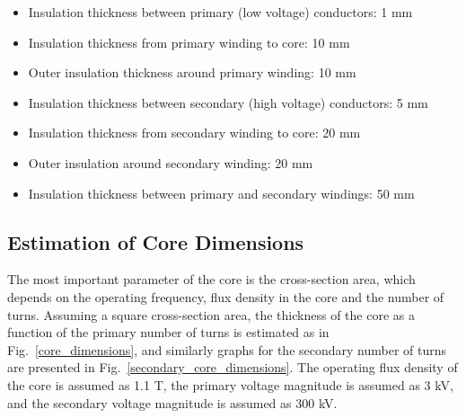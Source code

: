 \documentclass[a4paper, 11pt]{article} %
\begin{document}
\begin{itemize}
\item Insulation thickness between primary (low voltage) conductors: 1 mm
\item Insulation thickness from primary winding to core: 10 mm
\item Outer insulation thickness around primary winding: 10 mm
\item Insulation thickness between secondary (high voltage) conductors: 5 mm
\item Insulation thickness from secondary winding to core: 20 mm
\item Outer insulation around secondary winding: 20 mm
\item Insulation thickness between primary and secondary windings: 50 mm
\end{itemize}

\subsection{Estimation of Core Dimensions}

The most important parameter of the core is the cross-section area, which depends on the operating frequency, flux density in the core and the number of turns. Assuming a square cross-section area, the thickness of the core as  a function of the primary number of turns is estimated as in Fig.~\ref{core_dimensions}, and similarly graphs for the secondary number of turns are presented in Fig.~\ref{secondary_core_dimensions}. The operating flux density of the core is assumed as 1.1 T, the primary voltage magnitude is assumed as 3 kV, and the secondary voltage magnitude is assumed as 300 kV.
\end{document}
